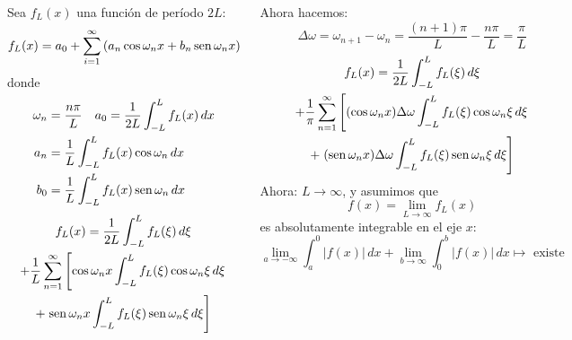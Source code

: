 \documentclass[9pt, aspectratio=169]{beamer}
\begin{document}
\begin{frame}
\begin{columns}[t]
\cx
Sea $f_L(x)$ una función de período $2L$:
\[ f_L(x) = a_0 + \sum_{i = 1}^{\infty} \left( a_n \cos \omega_n x + b_n \operatorname{sen} \omega_n x \right) \]
donde
\begin{align*}
    \omega_n &= \frac{n \pi}{L} \quad a_0= \frac{1}{2L} \int_{-L}^{L} f_L(x) \, dx \\
    a_n &= \frac{1}{L} \int_{-L}^{L} f_L(x) \cos \omega_n \, dx \\
    b_0 &= \frac{1}{L} \int_{-L}^{L} f_L(x) \operatorname{sen} \omega_n \, dx \\
\end{align*} \vspace{-3em}
\begin{multline*}
    f_L(x) = \frac{1}{2L} \int_{-L}^{L} f_L(\xi) \, d\xi \\
    + \frac{1}{L}\sum_{n = 1}^{\infty} \left[ \cos \omega_n x \int_{-L}^L f_L(\xi) \cos \omega_n \xi \, d\xi \right. \\
    + \left. \operatorname{sen} \omega_n x \int_{-L}^L f_L(\xi) \operatorname{sen} \omega_n \xi \, d\xi \right]
\end{multline*}

\cx
Ahora hacemos:
\[ \Delta \omega = \omega_{n+1} - \omega_n = \frac{(n + 1) \pi}{L} - \frac{n \pi}{L} = \frac{\pi}{L} \]
\begin{multline*}
    f_L(x) = \frac{1}{2L} \int_{-L}^{L} f_L(\xi) \, d\xi \\
    + \frac{1}{\pi}\sum_{n = 1}^{\infty} \left[ (\cos \omega_n x) \Delta \omega \int_{-L}^L f_L(\xi) \cos \omega_n \xi \, d\xi \right. \\
    + \left. (\operatorname{sen} \omega_n x) \Delta \omega \int_{-L}^L f_L(\xi) \operatorname{sen} \omega_n \xi \, d\xi \right]
\end{multline*}
Ahora: $L \rightarrow \infty$, y asumimos que
\[f(x) = \lim_{L \rightarrow \infty} f_L(x) \]
es \alert{absolutamente} integrable en el eje $x$:
\[ \lim_{a \rightarrow -\infty} \int_a^0 |f(x)| \, dx +  \lim_{b \rightarrow \infty} \int_0^b |f(x)| \, dx \mapsto \text{ existe} \]
\end{columns}
\end{frame}
\end{document}
